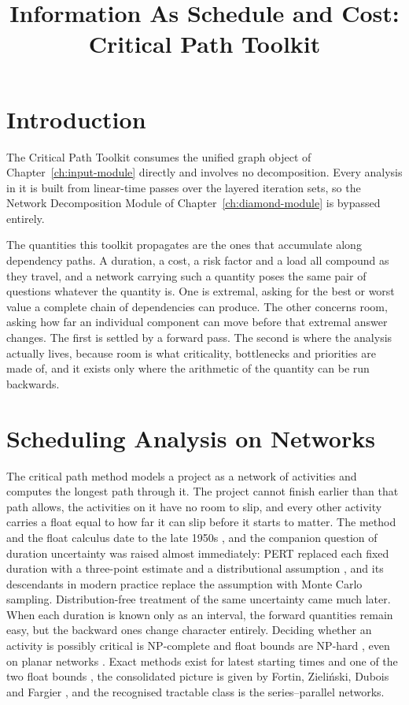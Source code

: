 \documentclass[12pt]{report}
\begin{document}
\title{Information As Schedule and Cost: Critical Path Toolkit}
\fi

\newcommand{\comb}{\oplus}
\newcommand{\prop}{\otimes}

\section{Introduction}
\label{sec:cpm-intro}

The Critical Path Toolkit consumes the unified graph object of
Chapter~\ref{ch:input-module} directly and involves no decomposition. Every
analysis in it is built from linear-time passes over the layered iteration
sets, so the Network Decomposition Module of Chapter~\ref{ch:diamond-module}
is bypassed entirely.

The quantities this toolkit propagates are the ones that accumulate along
dependency paths. A duration, a cost, a risk factor and a load all compound
as they travel, and a network carrying such a quantity poses the same pair
of questions whatever the quantity is. One is extremal, asking for the best
or worst value a complete chain of dependencies can produce. The other
concerns room, asking how far an individual component can move before that
extremal answer changes. The first is settled by a forward pass. The second
is where the analysis actually lives, because room is what criticality,
bottlenecks and priorities are made of, and it exists only where the
arithmetic of the quantity can be run backwards.

\section{Scheduling Analysis on Networks}
\label{sec:cpm-grounding}

The critical path method models a project as a network of activities and
computes the longest path through it. The project cannot finish earlier than
that path allows, the activities on it have no room to slip, and every other
activity carries a float equal to how far it can slip before it starts to
matter. The method and the float calculus date to the late 1950s
\cite{kelley1959critical}, and the companion question of duration uncertainty
was raised almost immediately: PERT replaced each fixed duration with a
three-point estimate and a distributional assumption
\cite{malcolm1959pert}, and its descendants in modern practice replace the
assumption with Monte Carlo sampling. Distribution-free treatment of the same
uncertainty came much later. When each duration is known only as an interval,
the forward quantities remain easy, but the backward ones change character
entirely. Deciding whether an activity is possibly critical is NP-complete
and float bounds are NP-hard \cite{chanas2002complexity}, even on planar
networks \cite{chanas2003planar}. Exact methods exist for latest starting
times and one of the two float bounds \cite{dubois2005floats}, the
consolidated picture is given by Fortin, Zieli\'{n}ski, Dubois and Fargier
\cite{fortin2010criticality}, and the recognised tractable class is the
series--parallel networks.
\end{document}
